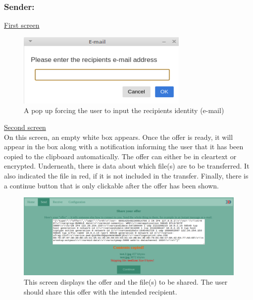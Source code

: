 
\subsubsection*{Sender:}
%
\noindent
\underline{First screen}
\begin{figure}[H]
  \centering
  \includegraphics[width=\textwidth]{Figures/SL/send_pop_up}
  \decoRule
  \caption[Enter recipient screen]{A pop up forcing the user to input the recipients identity (e-mail)}
  \label{fig:serv_s_pop}
\end{figure}

%
\noindent
\underline{Second screen}\\
On this screen, an empty white box appears. Once the offer is ready, it will appear in the box along with a notification informing the user that it has been copied to the clipboard automatically. The offer can either be in cleartext or encrypted. Underneath, there is data about which file(s) are to be transferred. It also indicated the file in red, if it is not included in the transfer. Finally, there is a continue button that is only clickable after the offer has been shown.
\begin{figure}[H]
  \centering
  \includegraphics[width=\textwidth]{Figures/SL/offer}
  \decoRule
  \caption[Offer screen]{This screen displays the offer and the file(s) to be shared. The user should share this offer with the intended recipient.}
  \label{fig:serv_s_off}
\end{figure}

